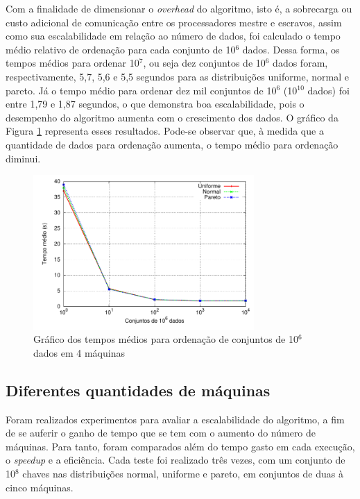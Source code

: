 Com a finalidade de dimensionar o \textit{overhead} do algoritmo, isto é, a sobrecarga ou custo adicional de comunicação entre os processadores mestre e escravos, assim como sua escalabilidade em relação ao número de dados, foi calculado o tempo médio relativo de ordenação para cada conjunto de 10$^6$ dados. 
Dessa forma, os tempos médios para ordenar 10$^7$, ou seja dez conjuntos de 10$^6$ dados foram, respectivamente, 5,7, 5,6 e 5,5 segundos para as distribuições uniforme, normal e pareto.
Já o tempo médio para ordenar dez mil conjuntos de 10$^6$  (10$^{10}$ dados) foi entre 1,79 e 1,87 segundos, o que demonstra boa escalabilidade, pois o desempenho do algoritmo aumenta com o crescimento dos dados. 
O gráfico da Figura \ref{fig:DadosOverhead} representa esses resultados. 
Pode-se observar que, à medida que a quantidade de dados para ordenação aumenta, o tempo médio para ordenação diminui. 

\begin{figure}[htb]
\centering
\includegraphics[width=0.75\textwidth]{figuras/DadosOverhead.pdf}
\caption{Gráfico dos tempos médios para ordenação de conjuntos de 10$^6$ dados em 4 máquinas}
\label{fig:DadosOverhead}
\end{figure}


\subsection{Diferentes quantidades de máquinas}

Foram realizados experimentos para avaliar a escalabilidade do algoritmo, a fim de se auferir o ganho de tempo que se tem com o aumento do número de máquinas. Para tanto, foram comparados além do tempo gasto em cada execução, o \textit{speedup} e a eficiência. Cada teste foi realizado três vezes, com um conjunto de 10$^8$ chaves nas distribuições normal, uniforme e pareto, em conjuntos de duas à cinco máquinas. 

